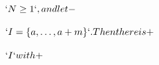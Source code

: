 \setlength{\textwidth}{0.6\paperwidth}



\setlength\abovedisplayskip{0pt} %


\begin{preview}
\color[rgb]{0.000,0.000,0.004}\setcounter{equation}{0}%
$`N \ge 1`, and let
-$
\end{preview}

\begin{preview}
\setcounter{equation}{0}%
$`I = \{a, \dots, a+m\}`. Then there is
+$
\end{preview}

\begin{preview}
\setcounter{equation}{0}%
$`I` with
+$
\end{preview}

\begin{preview}
\setcounter{equation}{0}%
\label{thm:main}
\end{preview}

\begin{preview}
\setcounter{equation}{0}%
\label{lem:pointwise}
\end{preview}


